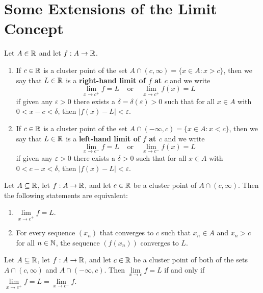 \section{Some Extensions of the Limit Concept}

\begin{definition}
	Let $A \in \mathbb{R}$ and let $f:A \rightarrow \mathbb{R}$.
	\begin{enumerate}
		\item If $c \in \mathbb{R}$ is a cluster point of the set $A \cap (c, \infty)= \{x \in A: x > c\}$, then we say that $L \in \mathbb{R}$ is a \textbf{right-hand limit of $f$ at $c$} and we write
		      \[\lim\limits_{x\to c^+} f=L\ \ \ \ \ \text{or}\ \ \ \ \ \lim\limits_{x\to c^+} f(x)=L\]
		      if given any $\varepsilon>0$ there exists a $\delta = \delta(\varepsilon)>0$ such that for all $x \in A$ with $0 < x-c < \delta$, then $|f(x)-L|<\varepsilon$.

		\item If $c \in \mathbb{R}$ is a cluster point of the set $A \cap (-\infty, c)=\{x \in A: x <c\}$, then we say that $L \in \mathbb{R}$ is a \textbf{left-hand limit of $f$ at $c$} and we write
		      \[\lim\limits_{x\to c^-} f = L\ \ \ \ \ \text{or}\ \ \ \ \ \lim\limits_{x\to c^-} f(x)=L\]
		      if given any $\varepsilon > 0$ there exists a $\delta >0$ such that for all $x \in A$ with $0 < c-x < \delta$, then $|f(x)-L|<\varepsilon$.
	\end{enumerate}
\end{definition}

\begin{theorem}
	Let $A \subseteq \mathbb{R}$, let $f:A \rightarrow \mathbb{R}$, and let $c \in \mathbb{R}$ be a cluster point of $A \cap (c,\infty)$. Then the following statements are equivalent:
	\begin{enumerate}
		\item $\lim\limits_{x\to c^+} f = L$.

		\item For every sequence $(x_n)$ that converges to $c$ such that $x_n \in A$ and $x_n > c$ for all $n \in \mathbb{N}$, the sequence $(f(x_n))$ converges to $L$.
	\end{enumerate}
\end{theorem}

\begin{theorem}
	Let $A \subseteq \mathbb{R}$, let $f:A \rightarrow \mathbb{R}$, and let $c \in \mathbb{R}$ be a cluster point of both of the sets $A \cap(c,\infty)$ and $A \cap (-\infty, c)$. Then $\lim\limits_{x\to c} f = L$ if and only if $\lim\limits_{x\to c^+} f = L = \lim\limits_{x\to c^-} f$.
\end{theorem}

